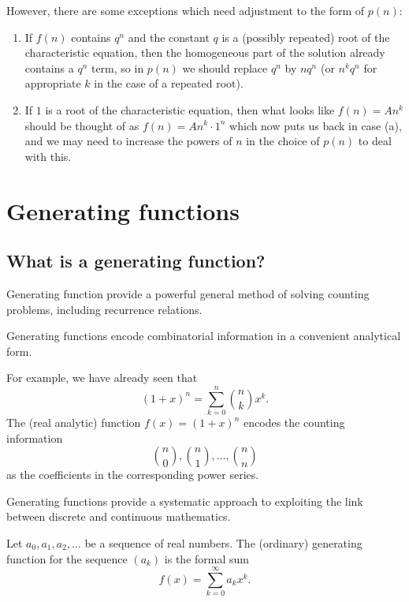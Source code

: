 \documentclass[10pt, a4paper]{article}
\begin{document}
However,
there are some exceptions which need adjustment to the form of $p(n)$:
\begin{enumerate}[label = (\alph*)]
    \item If $f(n)$ contains $q ^ n$ and the constant $q$ is a
    (possibly repeated)
    root of the characteristic equation,
    then the homogeneous part of the solution already contains a $q ^ n$ term,
    so in $p(n)$ we should replace $q ^ n$ by $nq ^ n$
    (or $n ^ kq ^ n$ for appropriate $k$ in the case of a repeated root).
    \item If $1$ is a root of the characteristic equation,
    then what looks like $f(n) = An ^ k$ should be thought of as $f(n) = An ^ k \cdot 1 ^ n$ which now puts us back in case (a),
    and we may need to increase the powers of $n$ in the choice of $p(n)$ to deal with this.
\end{enumerate}

\newpage

\section{Generating functions}

\subsection{What is a generating function?}

Generating function provide a powerful general method of solving counting problems,
including recurrence relations.

Generating functions encode combinatorial information in a convenient analytical form.

For example,
we have already seen that
\[
(1 + x) ^ n = \sum_{k = 0}^{n}\binom{n}{k}x ^ k.
\]
The
(real analytic)
function $f(x) = (1 + x) ^ n$ encodes the counting information
\[
\binom{n}{0}, \binom{n}{1}, \dotsc, \binom{n}{n}
\]
as the coefficients in the corresponding power series.

Generating functions provide a systematic approach to exploiting the link between discrete and continuous mathematics.

\begin{definition}
    Let $a_0, a_1, a_2, \dotsc$ be a sequence of real numbers.
    The
    (ordinary)
    generating function for the sequence $(a_k)$ is the formal sum
    \[
    f(x) = \sum_{k = 0}^{\infty}a_kx ^ k.
    \]
\end{definition}
\end{document}
